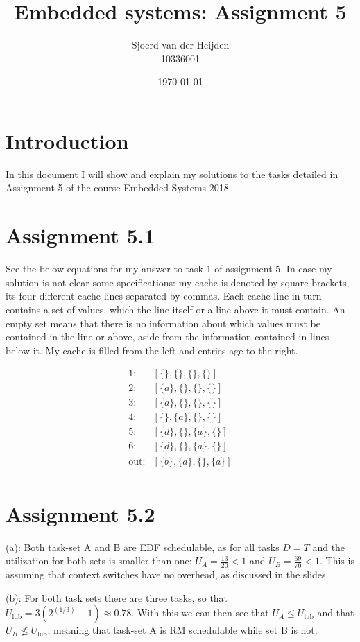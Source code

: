 \documentclass{article}
\title{Embedded systems: Assignment 5}
\date{\today}
\author{Sjoerd van der Heijden \\ 10336001}
\begin{document}
	\maketitle
	\section*{Introduction}
	\par In this document I will show and explain my solutions to the tasks detailed in Assignment 5 of the course Embedded Systems 2018.
	
	\section*{Assignment 5.1}
	\par See the below equations for my answer to task 1 of assignment 5. In case my solution is not clear some specifications: my cache is denoted by square brackets, its four different cache lines separated by commas. Each cache line in turn contains a set of values, which the line itself or a line above it must contain. An empty set means that there is no information about which values must be contained in the line or above, aside from the information contained in lines below it. My cache is filled from the left and entries age to the right.
	
	\begin{align*}
		1:& [\{\},\{\},\{\},\{\}]\\
		2:& [\{a\},\{\},\{\},\{\}]\\
		3:& [\{a\},\{\},\{\},\{\}]\\
		4:& [\{\},\{a\},\{\},\{\}]\\
		5:& [\{d\},\{\},\{a\},\{\}]\\
		6:& [\{d\},\{\},\{a\},\{\}]\\
		\textrm{out}:& [\{b\},\{d\},\{\},\{a\}]\\
	\end{align*}
	
	\section*{Assignment 5.2}
	\par (a): Both task-set A and B are EDF schedulable, as for all tasks $D = T$ and the utilization for both sets is smaller than one: $U_A = \frac{13}{20} < 1$ and $U_B = \frac{69}{70} < 1$. This is assuming that context switches have no overhead, as discussed in the slides.
	\par (b): For both task sets there are three tasks, so that $U_\textrm{lub} = 3(2^(1/3)-1) \approx 0.78$. With this we can then see that $U_A \leq U_\textrm{lub}$ and that $U_B \nleq U_\textrm{lub}$, meaning that task-set A is RM schedulable while set B is not.
	
\end{document}
